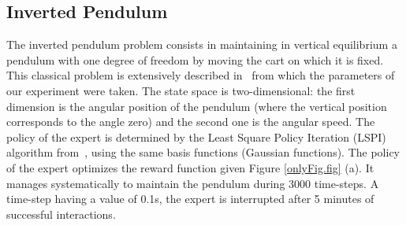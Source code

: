 \documentclass[tablecaption=bottom]{jmlr}
\begin{document}
\subsection{Inverted Pendulum}
%
%
The inverted pendulum problem consists in maintaining in vertical
equilibrium a pendulum with one degree of freedom by moving the cart
on which it is fixed. This classical problem is extensively
described in~\cite{lagoudakis2003least} from which the parameters of
our experiment were taken. The state space is two-dimensional: the
first dimension is the angular position of the pendulum (where the
vertical position corresponds to the angle zero) and the second one
is the angular speed. The policy of the expert is determined by the
Least Square Policy Iteration (LSPI) algorithm
from~\cite{lagoudakis2003least}, using the same basis functions
(Gaussian functions).
%
The policy of the expert optimizes the reward function given Figure
\ref{onlyFig.fig} (a). It manages systematically to maintain the
pendulum during 3000 time-steps. A time-step having a value of 0.1s,
the expert is interrupted after 5 minutes of successful
interactions.
%
%
\end{document}
